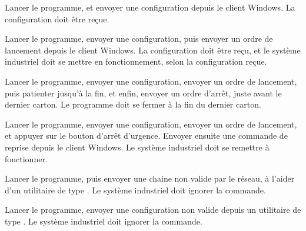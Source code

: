 {Lancer le programme, et envoyer une configuration depuis le client Windows.}
{La configuration doit être reçue.}

{Lancer le programme, envoyer une configuration, puis envoyer un ordre de
lancement depuis le client Windows.}
{La configuration doit être reçu, et le système industriel doit se mettre en
fonctionnement, selon la configuration reçue.}

{Lancer le programme, envoyer une configuration, envoyer un ordre de lancement,
puis patienter jusqu'à la fin, et enfin, envoyer un ordre d'arrêt, juste
avant le dernier carton.}
{Le programme doit se fermer à la fin du dernier carton.}

{Lancer le programme, envoyer une configuration, envoyer un ordre de lancement,
et appuyer sur le bouton d'arrêt d'urgence. Envoyer ensuite une commande de
    reprise depuis le client Windows.}
{Le système industriel doit se remettre à fonctionner.}

{Lancer le programme, puis envoyer une chaine non valide par le réseau, à
    l'aider d'un utilitaire de type .}
{Le système industriel doit ignorer la commande.}

{Lancer le programme, envoyer une configuration non valide depuis un utilitaire
    de type .}
{Le système industriel doit ignorer la commande.}
